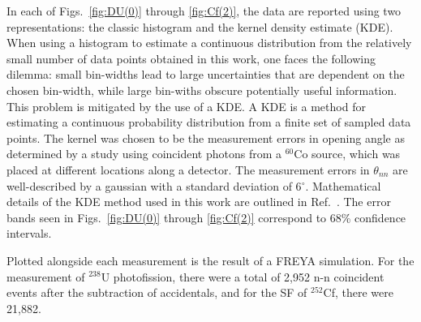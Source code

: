 In each of Figs.~\ref{fig:DU(0)} through \ref{fig:Cf(2)}, the data are reported using two representations: the classic histogram and the kernel density estimate (KDE).
When using a histogram to estimate a continuous distribution from the relatively small number of data points obtained in this work, one faces the following dilemma: small bin-widths lead to large uncertainties that are dependent on the chosen bin-width, while large bin-withs obscure potentially useful information. 
This problem is mitigated by the use of a KDE.
A KDE is a method for estimating a continuous probability distribution from a finite set of sampled data points.
The kernel was chosen to be the measurement errors in opening angle as determined by a study using coincident photons from a $^{60}$Co source, which was placed at different locations along a detector.
The measurement errors in $\theta_{nn}$ are well-described by a gaussian with a standard deviation of 6$^{\circ}$.
Mathematical details of the KDE method used in this work are outlined in Ref.~\cite{KDE}.
The error bands seen in Figs.~\ref{fig:DU(0)} through \ref{fig:Cf(2)} correspond to 68\% confidence intervals.

Plotted alongside each measurement is the result of a FREYA simulation.
For the measurement of $^{238}$U photofission, there were a total of 2,952 n-n coincident events after the subtraction of accidentals, and for the SF of $^{252}$Cf, there were  21,882.

